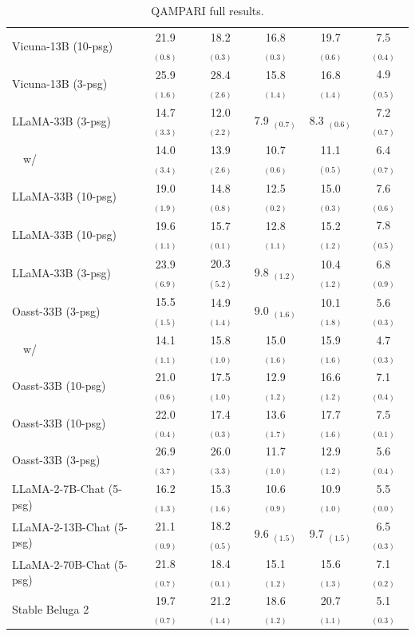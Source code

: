 \documentclass[11pt]{article}
\newcommand{\vani}{{\sc{Vanilla}}}
\newcommand{\summ}{{\sc{Summ}}}
\newcommand{\snippet}{{\sc{Snippet}}}
\newcommand{\rerank}{{\sc{Rerank}}}
\newcommand{\oracle}{{\sc{Oracle}}}
\begin{document}
\begin{table}[ht]
\begin{tabular}{lccccc}
            Vicuna-13B \snippet{} (10-psg) & 21.9 $_{(0.8)}$ & 18.2 $_{(0.3)}$ & 16.8 $_{(0.3)}$ & 19.7 $_{(0.6)}$ & 7.5 $_{(0.4)}$ \\
            Vicuna-13B \oracle{} (3-psg) & 25.9 $_{(1.6)}$ & 28.4 $_{(2.6)}$ & 15.8 $_{(1.4)}$ & 16.8 $_{(1.4)}$ & 4.9 $_{(0.5)}$ \\ \midrule
            LLaMA-33B \vani{} (3-psg) & 14.7 $_{(3.3)}$ & 12.0 $_{(2.2)}$ & 7.9 $_{(0.7)}$ & 8.3 $_{(0.6)}$ & 7.2 $_{(0.7)}$ \\
            ~~w/ \rerank & 14.0 $_{(3.4)}$ & 13.9 $_{(2.6)}$ & 10.7 $_{(0.6)}$ & 11.1 $_{(0.5)}$ & 6.4 $_{(0.7)}$ \\
            LLaMA-33B \summ{} (10-psg) & 19.0 $_{(1.9)}$ & 14.8 $_{(0.8)}$ & 12.5 $_{(0.2)}$ & 15.0 $_{(0.3)}$ & 7.6 $_{(0.6)}$ \\
            LLaMA-33B \snippet{} (10-psg) & 19.6 $_{(1.1)}$ & 15.7 $_{(0.1)}$ & 12.8 $_{(1.1)}$ & 15.2 $_{(1.2)}$ & 7.8 $_{(0.5)}$ \\
            LLaMA-33B \oracle{} (3-psg) & 23.9 $_{(6.9)}$ & 20.3 $_{(5.2)}$ & 9.8 $_{(1.2)}$ & 10.4 $_{(1.2)}$ & 6.8 $_{(0.9)}$ \\ \midrule
            Oasst-33B \vani{} (3-psg) & 15.5 $_{(1.5)}$ & 14.9 $_{(1.4)}$ & 9.0 $_{(1.6)}$ & 10.1 $_{(1.8)}$ & 5.6 $_{(0.3)}$ \\
            ~~w/ \rerank & 14.1 $_{(1.1)}$ & 15.8 $_{(1.0)}$ & 15.0 $_{(1.6)}$ & 15.9 $_{(1.6)}$ & 4.7 $_{(0.3)}$ \\
            Oasst-33B \summ{} (10-psg) & 21.0 $_{(0.6)}$ & 17.5 $_{(1.0)}$ & 12.9 $_{(1.2)}$ & 16.6 $_{(1.2)}$ & 7.1 $_{(0.4)}$ \\
            Oasst-33B \snippet{} (10-psg) & 22.0 $_{(0.4)}$ & 17.4 $_{(0.3)}$ & 13.6 $_{(1.7)}$ & 17.7 $_{(1.6)}$ & 7.5 $_{(0.1)}$ \\
            Oasst-33B \oracle{} (3-psg) & 26.9 $_{(3.7)}$ & 26.0 $_{(3.3)}$ & 11.7 $_{(1.0)}$ & 12.9 $_{(1.2)}$ & 5.6 $_{(0.4)}$ \\ 
            \midrule
            LLaMA-2-7B-Chat \vani{} (5-psg) & 16.2 $_{(1.3)}$&15.3 $_{(1.6)}$&10.6 $_{(0.9)}$&10.9 $_{(1.0)}$&5.5 $_{(0.0)}$\\
            LLaMA-2-13B-Chat \vani{} (5-psg) & 21.1 $_{(0.9)}$&18.2 $_{(0.5)}$&9.6 $_{(1.5)}$&9.7 $_{(1.5)}$&6.5 $_{(0.3)}$\\
            LLaMA-2-70B-Chat \vani{} (5-psg)  & 21.8 $_{(0.7)}$&18.4 $_{(0.1)}$&15.1 $_{(1.2)}$&15.6 $_{(1.3)}$&7.1 $_{(0.2)}$\\
            \midrule
            Stable Beluga 2 & 19.7 $_{(0.7)}$&21.2 $_{(1.4)}$&18.6 $_{(1.2)}$&20.7 $_{(1.1)}$&5.1 $_{(0.3)}$\\
            \bottomrule
            
        \end{tabular}
    \caption{
        QAMPARI full results.
    }
    \label{tab:qampari_full}
\end{table}
\end{document}
